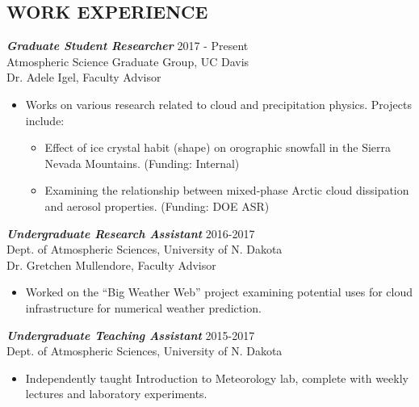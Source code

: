 \documentclass[margin]{res}
\begin{document}
\begin{resume}
\section{WORK EXPERIENCE} 
                {\sl \textbf{Graduate Student Researcher}} \hfill 2017 - Present \\
                Atmospheric Science Graduate Group, UC Davis \\
                Dr. Adele Igel, Faculty Advisor \\
                \begin{itemize}
                    \item Works on various research related to cloud and precipitation physics. Projects include:
                    \begin{itemize} \itemsep -2pt
                        \item Effect of ice crystal habit (shape) on orographic snowfall in the Sierra Nevada Mountains. (Funding: Internal)
                        \item Examining the relationship between mixed-phase Arctic cloud dissipation and aerosol properties. (Funding: DOE ASR) 
                    \end{itemize}
                \end{itemize}

                {\sl \textbf{Undergraduate Research Assistant}} \hfill 2016-2017 \\
                Dept. of Atmospheric Sciences, University of N. Dakota \\
                Dr. Gretchen Mullendore, Faculty Advisor \\
                \begin{itemize}\itemsep -2pt
                    \item Worked on the “Big Weather Web” project examining potential uses for cloud infrastructure for numerical weather prediction.
                \end{itemize}

                {\sl \textbf{Undergraduate Teaching Assistant}} \hfill 2015-2017 \\
                Dept. of Atmospheric Sciences, University of N. Dakota \\
                \begin{itemize}\itemsep -2pt
                    \item Independently taught Introduction to Meteorology lab, complete with weekly lectures and laboratory experiments.
                    

\end{itemize}
\end{resume}
\end{document}
